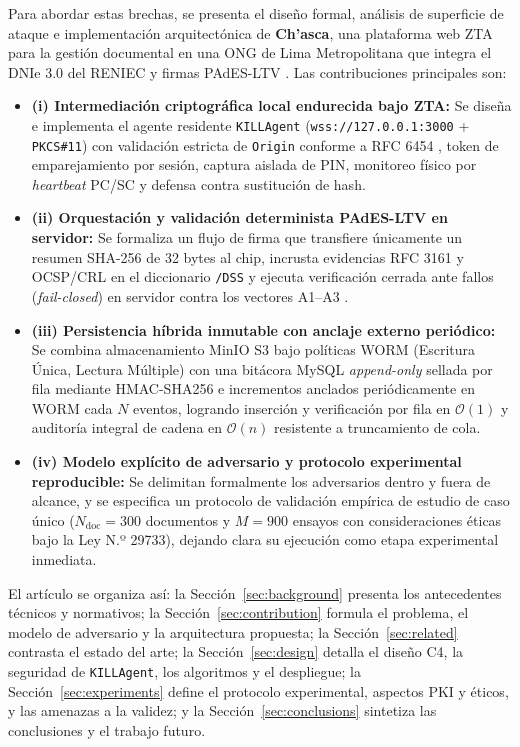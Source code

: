 \documentclass[runningheads,twocolumn]{llncs}
\newcounter{algoritmo}
\begin{document}
Para abordar estas brechas, se presenta el diseño formal, análisis de superficie de ataque e implementación arquitectónica de \textbf{Ch'asca}, una plataforma web ZTA para la gestión documental en una ONG de Lima Metropolitana que integra el DNIe 3.0 del RENIEC \cite{reniec2025} y firmas PAdES-LTV \cite{doynov2026,etsi2024}. Las contribuciones principales son:
\begin{itemize}
    \item \textbf{(i) Intermediación criptográfica local endurecida bajo ZTA:} Se diseña e implementa el agente residente \texttt{KILLAgent} (\texttt{wss://127.0.0.1:3000} + \texttt{PKCS\#11}) con validación estricta de \texttt{Origin} conforme a RFC 6454 \cite{rfc6454}, token de emparejamiento por sesión, captura aislada de PIN, monitoreo físico por \textit{heartbeat} PC/SC y defensa contra sustitución de hash.
    \item \textbf{(ii) Orquestación y validación determinista PAdES-LTV en servidor:} Se formaliza un flujo de firma que transfiere únicamente un resumen SHA-256 de 32 bytes al chip, incrusta evidencias RFC 3161 y OCSP/CRL en el diccionario \texttt{/DSS} y ejecuta verificación cerrada ante fallos (\textit{fail-closed}) en servidor contra los vectores A1--A3 \cite{heher2027}.
    \item \textbf{(iii) Persistencia híbrida inmutable con anclaje externo periódico:} Se combina almacenamiento MinIO S3 bajo políticas WORM (Escritura Única, Lectura Múltiple) con una bitácora MySQL \textit{append-only} sellada por fila mediante HMAC-SHA256 e incrementos anclados periódicamente en WORM cada $N$ eventos, logrando inserción y verificación por fila en $\mathcal{O}(1)$ y auditoría integral de cadena en $\mathcal{O}(n)$ resistente a truncamiento de cola.
    \item \textbf{(iv) Modelo explícito de adversario y protocolo experimental reproducible:} Se delimitan formalmente los adversarios dentro y fuera de alcance, y se especifica un protocolo de validación empírica de estudio de caso único ($N_{\text{doc}}=300$ documentos y $M=900$ ensayos con consideraciones éticas bajo la Ley N.º 29733), dejando clara su ejecución como etapa experimental inmediata.
\end{itemize}

El artículo se organiza así: la Sección~\ref{sec:background} presenta los antecedentes técnicos y normativos; la Sección~\ref{sec:contribution} formula el problema, el modelo de adversario y la arquitectura propuesta; la Sección~\ref{sec:related} contrasta el estado del arte; la Sección~\ref{sec:design} detalla el diseño C4, la seguridad de \texttt{KILLAgent}, los algoritmos y el despliegue; la Sección~\ref{sec:experiments} define el protocolo experimental, aspectos PKI y éticos, y las amenazas a la validez; y la Sección~\ref{sec:conclusions} sintetiza las conclusiones y el trabajo futuro.
\end{document}
